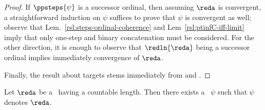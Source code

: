 \begin{proof}
If $\ppsteps{\psi}$ is a successor ordinal, then assuming $\reda$ is convergent, a straightforward induction on $\psi$ suffices to prove that $\psi$ is convergent as well; observe that Lem.~\ref{rsl:steps-ordinal-coherence} and Lem~\ref{rsl:ptinfC-iff-limit} imply that only one-step and binary concatenation must be considered. For the other direction, it is enough to observe that $\redln{\reda}$ being a successor ordinal implies immediately convergence of $\reda$.

Finally, the result about targets stems immediately from  and .
\end{proof}


\begin{proposition}
\label{rsl:denotation-existence}
Let $\reda$ be a \redseq\ having a countable length. Then there exists a \pnpterm\ $\psi$ such that $\psi$ denotes $\reda$.
\end{proposition}

